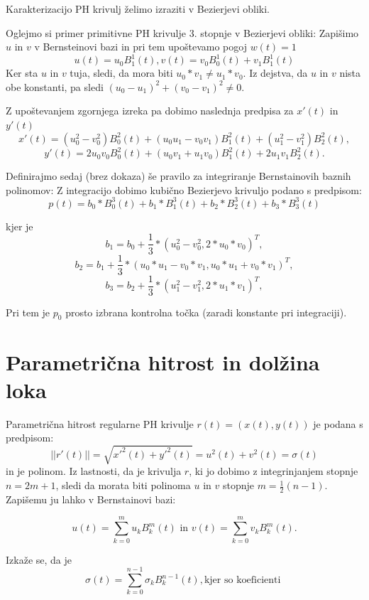 \documentclass[12pt]{article}
\begin{document}
Karakterizacijo PH krivulj želimo izraziti v Bezierjevi obliki.

Oglejmo si primer primitivne PH krivulje 3. stopnje v Bezierjevi obliki:
Zapišimo $u$ in $v$ v Bernsteinovi bazi in pri tem upoštevamo pogoj $w(t) = 1$
$$u(t) = u_0 B^1_1(t), v(t) = v_0 B^1_0(t) + v_1 B^1_1(t)$$
Ker sta $u$ in $v$ tuja, sledi, da mora biti $u_0*v_1 \neq u_1*v_0$. Iz dejstva, da
$u$ in $v$ nista obe konstanti, pa sledi $(u_0 - u_1)^2 + (v_0 - v_1)^2 \neq 0$.

Z upoštevanjem zgornjega izreka pa dobimo naslednja predpisa za $x'(t)$ in $y'(t)$
$$x'(t) = (u_0^2 - v_0^2) B_0^2(t) + (u_0 u_1 - v_0 v_1) B_1^2(t) + (u_1^2 - v_1^2) B_2^2(t),$$
$$y'(t) = 2 u_0 v_0 B_0^2(t) + (u_0 v_1 + u_1 v_0) B_1^2(t) + 2 u_1 v_1 B_2^2(t).$$

Definirajmo sedaj (brez dokaza) še pravilo za integriranje Bernstainovih baznih polinomov:
Z integracijo dobimo kubično Bezierjevo krivuljo podano s predpisom:
$$p(t) = b_0*B_0^3(t) + b_1*B_1^3(t) + b_2*B_2^3(t) + b_3*B_3^3(t)$$

kjer je
$$b_1 = b_0 + \frac{1}{3}*(u_0^2 - v_0^2, 2*u_0*v_0)^T,$$
$$b_2 = b_1 + \frac{1}{3}*(u_0*u_1 - v_0*v_1, u_0*u_1 + v_0*v_1)^T,$$
$$b_3 = b_2 + \frac{1}{3}*(u_1^2 - v_1^2, 2*u_1*v_1)^T,$$

Pri tem je $p_0$ prosto izbrana kontrolna točka (zaradi konstante pri integraciji).
\section{Parametrična hitrost in dolžina loka}

Parametrična hitrost regularne PH krivulje $r(t) = (x(t), y(t))$ je podana s predpisom:
$$ || r\prime (t) || =\sqrt{x\prime^2(t)+y\prime^2(t)}= u^2 (t) + v^2 (t) = \sigma (t)$$
in je polinom. \newline
Iz lastnosti, da je krivulja $r$, ki jo dobimo z integrinjanjem stopnje $n = 2m + 1$, sledi
da morata biti polinoma $u$ in $v$ stopnje  $m = \frac{1}{2}(n - 1)$. Zapišemu ju lahko v 
Bernstainovi bazi:

	$$u (t)=\sum_{k=0}^m u_kB_k^m(t) \text{ in } v (t) =\sum_{k=0}^m v_kB_k^m(t).$$
	

Izkaže se, da je 
$$\sigma (t) =\sum_{k=0}^{n-1} \sigma_kB_k^{n-1}(t), \text{kjer so koeficienti }$$ 
\end{document}
